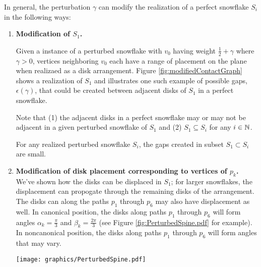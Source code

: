 In general, the perturbation $\gamma$ can modify the realization of a perfect snowflake $S_i$ in the following ways:
\begin{enumerate}
\item \textbf{Modification of $S_1$.} 

Given a instance of a perturbed snowflake with $v_0$ having weight $\frac{1}{2} + \gamma$ where $\gamma > 0$, vertices neighboring $v_0$ each have a range of placement on the plane when realizaed as a disk arrangement. 
Figure \ref{fig:modifiedContactGraph} shows a realization of $S_1$ and illustrates one such example of possible gaps, $\epsilon (\gamma)$, that could be created between adjacent disks of $S_1$ in a perfect snowflake.  

Note that (1) the adjacent disks in a perfect snowflake may or may not be adjacent in a given perturbed snowflake of $S_1$ and (2) $S_1 \subseteq S_i$ for any $i \in {\mathbb{N}}$.  

\begin{lem}\label{lem:s1Small}
For any realized perturbed snowflake $S_i$, the gaps created in subset $S_1 \subset S_i$ are small.
\end{lem}

\item \textbf{Modification of disk placement corresponding to vertices of $p_k$.}
We've shown how the disks can be displaced in $S_1$; for larger snowflakes, the displacement can propogate through the remaining disks of the arrangement.  
The disks can along the paths $p_1$ through $p_6$ may also have displacement as well.  
In canonical position, the disks along paths $p_1$ through $p_6$ will form angles $\alpha_k =\frac{\pi}{3} $ and $\beta_k=\frac{2\pi}{3}$ (see Figure \ref{fig:PerturbedSpine.pdf} for example).  
In noncanonical position, the disks along paths $p_1$ through $p_6$ will form angles that may vary.  

\begin{minipage}{\linewidth}
\begin{center}
\texttt{[image: graphics/PerturbedSpine.pdf]}
\label{fig:PerturbedSpine.pdf}
\end{center}
\end{minipage}


\end{enumerate}

